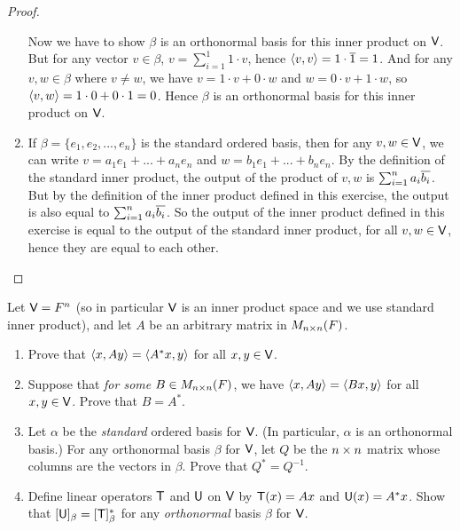 \begin{proof}
\begin{enumerate}
Now we have to show \(\beta\) is an orthonormal basis for this inner product on \(\textsf{V}\).
But for any vector \(v \in \beta\), \(v = \sum_{i = 1}^1 1 \cdot v\), hence \(\left< v, v \right> = 1 \cdot \overline{1} = 1\).
And for any \(v, w \in \beta\) where \(v \ne w\), we have \(v = 1 \cdot v + 0 \cdot w\) and \(w = 0 \cdot v + 1 \cdot w\), so \(\left< v, w \right> = 1 \cdot 0 + 0 \cdot 1 = 0\).
Hence \(\beta\) is an orthonormal basis for this inner product on \(\textsf{V}\).

\item If \(\beta = \{ e_1, e_2, ..., e_n \}\) is the standard ordered basis, then for any \(v, w \in \textsf{V}\), we can write \(v = a_1 e_1 + ... + a_n e_n\) and \(w = b_1 e_1 + ... + b_n e_n\).
By the definition of the standard inner product, the output of the product of \(v, w\) is \(\sum_{i = 1}^n a_i \overline{b_i}\).
But by the definition of the inner product defined in this exercise, the output is also equal to \(\sum_{i = 1}^n a_i \overline{b_i}\).
So the output of the inner product defined in this exercise is equal to the output of the standard inner product, for all \(v, w \in \textsf{V}\), hence they are equal to each other.
\end{enumerate}
\end{proof}

\begin{exercise} \label{exercise 6.1.23}
Let \(\textsf{V} = F^n\) (so in particular \(\textsf{V}\) is an inner product space and we use standard inner product), and let \(A\) be an arbitrary matrix in \(M_{n \times n}(F)\).
\begin{enumerate}
\item Prove that \(\left< x, Ay \right> = \left< A^*x, y \right>\) for all \(x, y \in \textsf{V}\).
\item Suppose that \emph{for some} \(B \in M_{n \times n}(F)\), we have \(\left< x, Ay \right> = \left< B x, y \right>\) for all \(x, y \in \textsf{V}\).
Prove that \(B = A^*\).
\item Let \(\alpha\) be the \emph{standard} ordered basis for \(\textsf{V}\).
(In particular, \(\alpha\) is an orthonormal basis.)
For any orthonormal basis \(\beta\) for \(\textsf{V}\), let \(Q\) be the \(n \times n\) matrix whose columns are the vectors in \(\beta\).
Prove that \(Q^* = Q^{-1}\).
\item Define linear operators \(\textsf{T}\) and \(\textsf{U}\) on \(\textsf{V}\) by \(\textsf{T}(x) = Ax\) and \(\textsf{U}(x) = A^* x\).
Show that \([\textsf{U}]_{\beta} = [\textsf{T}]_{\beta}^*\) for any \emph{orthonormal} basis \(\beta\) for \(\textsf{V}\).
\end{enumerate}
\end{exercise}

